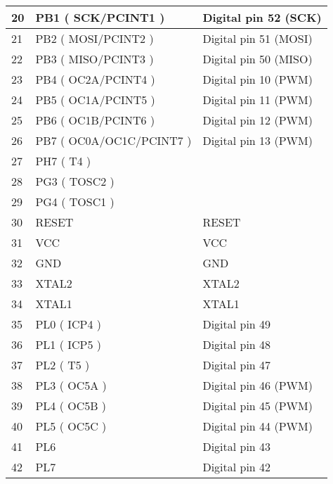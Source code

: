 \begin{longtable}[c]{|l|l|l|}
    20         & PB1 ( SCK/PCINT1 )       & Digital pin 52 (SCK)  \\ \hline
    21         & PB2 ( MOSI/PCINT2 )      & Digital pin 51 (MOSI) \\ \hline
    22         & PB3 ( MISO/PCINT3 )      & Digital pin 50 (MISO) \\ \hline
    23         & PB4 ( OC2A/PCINT4 )      & Digital pin 10 (PWM)  \\ \hline
    24         & PB5 ( OC1A/PCINT5 )      & Digital pin 11 (PWM)  \\ \hline
    25         & PB6 ( OC1B/PCINT6 )      & Digital pin 12 (PWM)  \\ \hline
    26         & PB7 ( OC0A/OC1C/PCINT7 ) & Digital pin 13 (PWM)  \\ \hline
    27         & PH7 ( T4 )               &                       \\ \hline
    28         & PG3 ( TOSC2 )            &                       \\ \hline
    29         & PG4 ( TOSC1 )            &                       \\ \hline
    30         & RESET                    & RESET                 \\ \hline
    31         & VCC                      & VCC                   \\ \hline
    32         & GND                      & GND                   \\ \hline
    33         & XTAL2                    & XTAL2                 \\ \hline
    34         & XTAL1                    & XTAL1                 \\ \hline
    35         & PL0 ( ICP4 )             & Digital pin 49        \\ \hline
    36         & PL1 ( ICP5 )             & Digital pin 48        \\ \hline
    37         & PL2 ( T5 )               & Digital pin 47        \\ \hline
    38         & PL3 ( OC5A )             & Digital pin 46 (PWM)  \\ \hline
    39         & PL4 ( OC5B )             & Digital pin 45 (PWM)  \\ \hline
    40         & PL5 ( OC5C )             & Digital pin 44 (PWM)  \\ \hline
    41         & PL6                      & Digital pin 43        \\ \hline
    42         & PL7                      & Digital pin 42        \\ \hline

\end{longtable}
